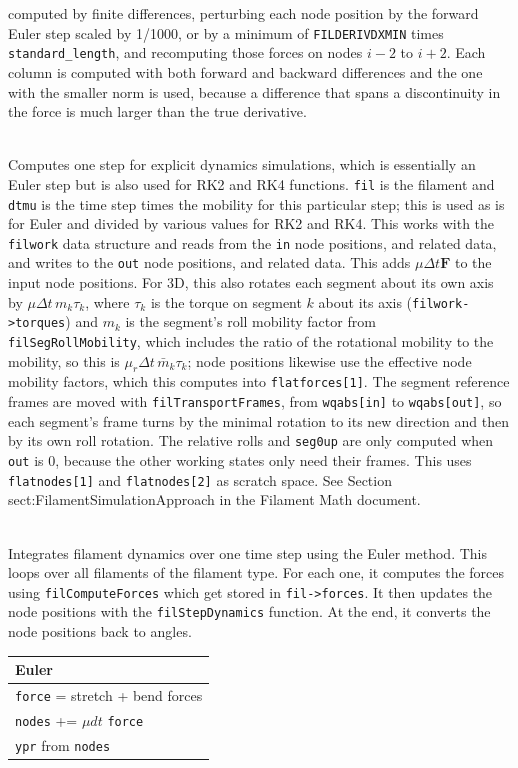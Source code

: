 \documentclass {scrbook}
\newcommand {\ttt} {\texttt}
\begin{document}
\begin{description}
computed by finite differences, perturbing each node position by the forward Euler step scaled by 1/1000, or by a minimum of \ttt{FILDERIVDXMIN} times \ttt{standard\_length}, and recomputing those forces on nodes $i-2$ to $i+2$. Each column is computed with both forward and backward differences and the one with the smaller norm is used, because a difference that spans a discontinuity in the force is much larger than the true derivative.


\item[\underline{Dynamics functions}]

\item[\ttt{void filStepDynamics(filamentptr fil,double dtmu,int in,int out)}]
\hfill \\
Computes one step for explicit dynamics simulations, which is essentially an Euler step but is also used for RK2 and RK4 functions. \ttt{fil} is the filament and \ttt{dtmu} is the time step times the mobility for this particular step; this is used as is for Euler and divided by various values for RK2 and RK4. This works with the \ttt{filwork} data structure and reads from the \ttt{in} node positions, and related data, and writes to the \ttt{out} node positions, and related data. This adds $\mu \Delta t \bm{F}$ to the input node positions. For 3D, this also rotates each segment about its own axis by $\mu \Delta t\, m_k \tau_k$, where $\tau_k$ is the torque on segment $k$ about its axis (\ttt{filwork->torques}) and $m_k$ is the segment's roll mobility factor from \ttt{filSegRollMobility}, which includes the ratio of the rotational mobility to the mobility, so this is $\mu_r \Delta t\, \bar{m}_k \tau_k$; node positions likewise use the effective node mobility factors, which this computes into \ttt{flatforces[1]}. The segment reference frames are moved with \ttt{filTransportFrames}, from \ttt{wqabs[in]} to \ttt{wqabs[out]}, so each segment's frame turns by the minimal rotation to its new direction and then by its own roll rotation. The relative rolls and \ttt{seg0up} are only computed when \ttt{out} is 0, because the other working states only need their frames. This uses \ttt{flatnodes[1]} and \ttt{flatnodes[2]} as scratch space. See Section sect:FilamentSimulationApproach in the Filament Math document.

\item[\ttt{void filEulerDynamics(simptr sim,filamenttypeptr filtype)}]
\hfill \\
Integrates filament dynamics over one time step using the Euler method. This loops over all filaments of the filament type. For each one, it computes the forces using \ttt{filComputeForces} which get stored in \ttt{fil->forces}. It then updates the node positions with the \ttt{filStepDynamics} function. At the end, it converts the node positions back to angles.
\begin{longtable}[c]{l}
Euler \\
\hline
\ttt{force} = stretch + bend forces \\
\ttt{nodes} += $\mu dt $ \ttt{force} \\
\ttt{ypr} from \ttt{nodes}
\end{longtable}


\end{description}
\end{document}
